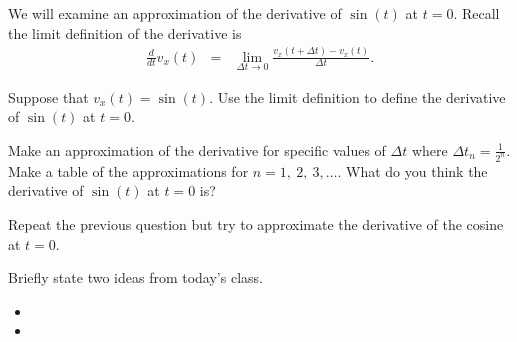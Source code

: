 \begin{problem}
\begin{subproblem}
  \end{subproblem}

  \clearpage

\item We will examine an approximation of the derivative of $\sin(t)$
  at $t=0$.  Recall the limit definition of the derivative is
  \begin{eqnarray*}
    \frac{d}{dt} v_x(t) & = & \lim_{\Delta t \rightarrow 0}
                              \frac{v_x(t+\Delta t) - v_x(t)}{\Delta t}.
  \end{eqnarray*}
  \begin{subproblem}
  \item Suppose that $v_x(t)=\sin(t)$. Use the limit definition to
    define the derivative of $\sin(t)$ at $t=0$.
    \vspace{6em}
    
  \item Make an approximation of the derivative for specific values of
    $\Delta t$ where $\Delta t_n=\frac{1}{2^n}$. Make a table of the
    approximations for $n=1,~2,~3,\ldots$. What do you think the
    derivative of $\sin(t)$ at $t=0$ is?

    \vfill
    
  \end{subproblem}

  \clearpage
  
\item Repeat the previous question but try to approximate the
  derivative of the cosine at $t=0$.

  \vfill

\end{problem}

\postClass

\begin{problem}
\item Briefly state two ideas from today's class.
  \begin{itemize}
  \item
  \item
  \end{itemize}
\item
  \begin{subproblem}
    \item
  \end{subproblem}
\end{problem}


